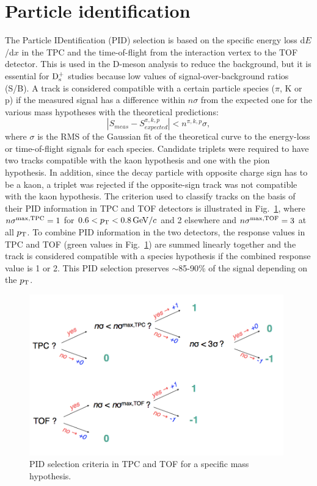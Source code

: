 \section{Particle identification}
\label{Sec:PID}
The Particle IDentification (PID) selection is based on the specific energy loss 
d$E$/d$x$ in the TPC and the time-of-flight from the interaction vertex to the 
TOF detector. This is used in the D-meson analysis to reduce the background, 
but it is essential for ${\rm D_s^+}$ studies because low values of signal-over-background
 ratios (S/B).
A track is  considered compatible with a certain particle species 
($\pi$, K or p) if the measured signal has a difference 
within $n\sigma$ from the expected one for the various mass hypotheses
  with the theoretical predictions:
\[
|S_{meas}-S^{\pi,k,p}_{expected}| < n^{\pi,k,p}\sigma ,
\]
where $\sigma$ is the RMS of the Gaussian fit of the theoretical 
curve to the energy-loss or time-of-flight signals for each species.
Candidate triplets were required to have two tracks compatible with 
the kaon hypothesis and one with the pion hypothesis. In addition, 
since the decay particle with opposite charge sign has to be a kaon, 
a triplet was rejected if the opposite-sign track was not compatible 
with the kaon hypothesis. 
The criterion used to classify tracks on the basis of their PID
information in TPC and TOF detectors is 
illustrated in Fig.~\ref{fig:strongPID}, where $n\sigma^{\rm max,TPC} = 1$ for
$0.6 < p_{\rm T} < 0.8 \, \mathrm{GeV}/c$ and 2 elsewhere and $n\sigma^{\rm max,TOF} = 3$ at all $p_{\rm T}$.  
To combine PID information in the two detectors,
the response values in TPC and TOF (green values in Fig.~\ref{fig:strongPID}) 
are summed linearly together 
and the track is considered
compatible with a species hypothesis if the combined response value is 1 or 2. This
PID selection preserves $\sim$85-90\% of the signal depending on the $p_{\rm T}$.

 
\begin{figure}[!h]
\centering
\includegraphics[width=11cm]{FigCap4/strongPID.png}
\caption{PID selection criteria in TPC and TOF for a specific mass hypothesis.}
\label{fig:strongPID}
\end{figure}


